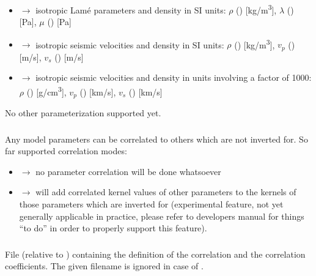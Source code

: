 \subsubsection{} \label{files,sec:main_parfile,itm:mod_pmtrz}
\begin{itemize}
\item[]  $\rightarrow$ isotropic Lam\'e parameters and density in SI units: 
    $\rho$ () [kg/m\textsuperscript{3}], $\lambda$ () [Pa], $\mu$ ()  [Pa]
\item[]  $\rightarrow$ isotropic seismic velocities and density in SI units:
    $\rho$ () [kg/m\textsuperscript{3}], $v_p$ () [m/s], $v_s$ () [m/s]
\item[]  $\rightarrow$ isotropic seismic velocities and density in  
  units involving a factor of 1000: $\rho$ () [g/cm\textsuperscript{3}], $v_p$ () [km/s], 
  $v_s$ () [km/s]
\end{itemize}
No other parameterization supported yet.
\subsubsection{} \label{files,sec:main_parfile,itm:par_cor_mode}
Any model parameters can be correlated to others which are not inverted for. So far supported correlation modes:
\begin{itemize}
\item[]  $\rightarrow$ no parameter correlation will be done whatsoever
\item[]  $\rightarrow$ will add correlated kernel values of other parameters to the kernels
  of those parameters which are inverted for (experimental feature, not yet generally applicable in practice, 
  please refer to \ASKI{} developers manual for things ``to do'' in order to properly support this feature).
\end{itemize}
\subsubsection{} \label{files,sec:main_parfile,itm:par_cor_file}
File (relative to ) containing the definition of the correlation and the correlation coefficients. 
The given filename is ignored in case of .
